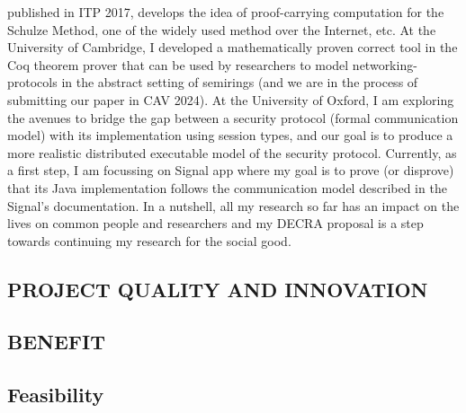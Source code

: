 \documentclass[12pt,a4paper]{article}
\newcommand{\todo}[1]{\textcolor{red}{#1}}
\newcommand*{\TitleFont}{%
      \usefont{\encodingdefault}{\rmdefault}{b}{n}%
      \fontsize{12}{12}%
      \selectfont}
\begin{document}
published in ITP 2017, develops the idea of proof-carrying computation for 
the Schulze Method, one of the widely used method over the Internet, etc. 
At the University of Cambridge, I developed a mathematically proven correct tool in 
the Coq theorem prover that can be used by researchers to model networking-protocols in the abstract
setting of semirings (and we are in the process of submitting our paper in CAV 2024).
At the University of Oxford, I am exploring the avenues to bridge the gap between a security protocol
(formal communication model) with its implementation using session types, and our
goal is to produce a more realistic distributed executable model of the security protocol.
Currently, as a first step, I am focussing on Signal app
where my goal is to prove (or disprove) that its Java implementation follows the
communication model described in the Signal's documentation.
In a nutshell, all my research so far has an impact on the lives on common people and
researchers and my DECRA proposal is a step towards continuing my research 
for the social good. 


\subsection*{PROJECT QUALITY AND INNOVATION}



\subsection*{BENEFIT}

\subsection*{Feasibility}


\renewcommand{\refname}{\normalfont\selectfont\TitleFont REFERENCES} 
\begingroup
    \fontsize{10pt}{10pt}\selectfont





\endgroup
\end{document}
